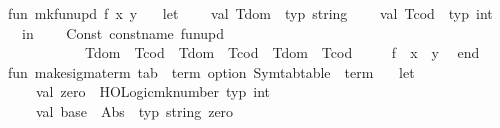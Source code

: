 \begin{isabellebody}
\isanewline
\isanewline
fun\ mk{\isacharunderscore}{\kern0pt}fun{\isacharunderscore}{\kern0pt}upd\ {\isacharparenleft}{\kern0pt}f{\isacharcomma}{\kern0pt}\ x{\isacharcomma}{\kern0pt}\ y{\isacharparenright}{\kern0pt}\ {\isacharequal}{\kern0pt}\isanewline
\ \ let\isanewline
\ \ \ \ val\ T{\isacharunderscore}{\kern0pt}dom\ {\isacharequal}{\kern0pt}\ {\isacharat}{\kern0pt}{\isacharbraceleft}{\kern0pt}typ\ string{\isacharbraceright}{\kern0pt}\isanewline
\ \ \ \ val\ T{\isacharunderscore}{\kern0pt}cod\ {\isacharequal}{\kern0pt}\ {\isacharat}{\kern0pt}{\isacharbraceleft}{\kern0pt}typ\ int{\isacharbraceright}{\kern0pt}\isanewline
\ \ in\isanewline
\ \ \ \ Const\ {\isacharparenleft}{\kern0pt}{\isacharat}{\kern0pt}{\isacharbraceleft}{\kern0pt}const{\isacharunderscore}{\kern0pt}name\ fun{\isacharunderscore}{\kern0pt}upd{\isacharbraceright}{\kern0pt}{\isacharcomma}{\kern0pt}\isanewline
\ \ \ \ \ \ \ \ \ \ \ {\isacharparenleft}{\kern0pt}T{\isacharunderscore}{\kern0pt}dom\ {\isacharminus}{\kern0pt}{\isacharminus}{\kern0pt}{\isachargreater}{\kern0pt}\ T{\isacharunderscore}{\kern0pt}cod{\isacharparenright}{\kern0pt}\ {\isacharminus}{\kern0pt}{\isacharminus}{\kern0pt}{\isachargreater}{\kern0pt}\ T{\isacharunderscore}{\kern0pt}dom\ {\isacharminus}{\kern0pt}{\isacharminus}{\kern0pt}{\isachargreater}{\kern0pt}\ T{\isacharunderscore}{\kern0pt}cod\ {\isacharminus}{\kern0pt}{\isacharminus}{\kern0pt}{\isachargreater}{\kern0pt}\ {\isacharparenleft}{\kern0pt}T{\isacharunderscore}{\kern0pt}dom\ {\isacharminus}{\kern0pt}{\isacharminus}{\kern0pt}{\isachargreater}{\kern0pt}\ T{\isacharunderscore}{\kern0pt}cod{\isacharparenright}{\kern0pt}{\isacharparenright}{\kern0pt}\isanewline
\ \ \ \ {\isachardollar}{\kern0pt}\ f\ {\isachardollar}{\kern0pt}\ x\ {\isachardollar}{\kern0pt}\ y\isanewline
\ \ end\isanewline
\isanewline
fun\ make{\isacharunderscore}{\kern0pt}sigma{\isacharunderscore}{\kern0pt}term\ {\isacharparenleft}{\kern0pt}tab\ {\isacharcolon}{\kern0pt}\ term\ option\ Symtab{\isachardot}{\kern0pt}table{\isacharparenright}{\kern0pt}\ {\isacharcolon}{\kern0pt}\ term\ {\isacharequal}{\kern0pt}\isanewline
\ \ let\isanewline
\ \ \ \ val\ zero\ {\isacharequal}{\kern0pt}\ HOLogic{\isachardot}{\kern0pt}mk{\isacharunderscore}{\kern0pt}number\ {\isacharat}{\kern0pt}{\isacharbraceleft}{\kern0pt}typ\ int{\isacharbraceright}{\kern0pt}\ {}\isanewline
\ \ \ \ val\ base\ {\isacharequal}{\kern0pt}\ Abs\ {\isacharparenleft}{\kern0pt}{\isachardoublequote}{\kern0pt}{\isacharunderscore}{\kern0pt}{\isachardoublequote}{\kern0pt}{\isacharcomma}{\kern0pt}\ {\isacharat}{\kern0pt}{\isacharbraceleft}{\kern0pt}typ\ string{\isacharbraceright}{\kern0pt}{\isacharcomma}{\kern0pt}\ zero{\isacharparenright}{\kern0pt}\ \isanewline

\end{isabellebody}
